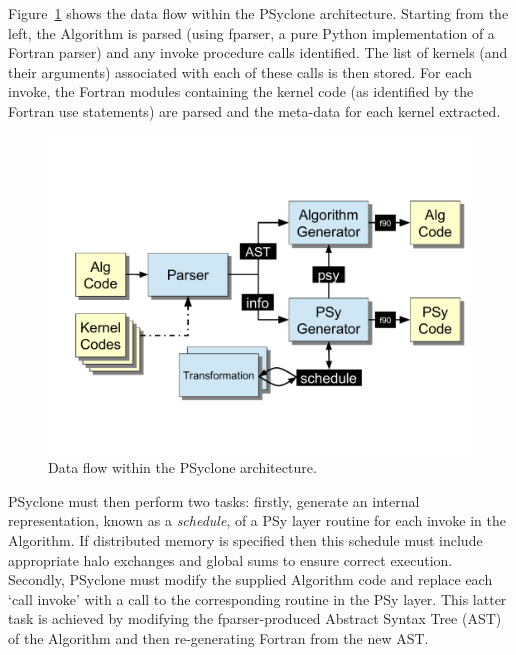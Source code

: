 \documentclass[review,times]{elsarticle}
\begin{document}
Figure~\ref{fig:psyclone-arch} shows the data flow within the PSyclone
architecture.  Starting from the left, the Algorithm is parsed (using
fparser, a pure Python implementation of a Fortran parser) and any
invoke procedure calls identified. The list of kernels (and their arguments)
associated with each of these calls is then stored. For each invoke,
the Fortran modules containing the kernel code (as identified by
the Fortran use statements) are parsed and the meta-data for each kernel
extracted.

\begin{figure}
\centering\includegraphics[width=0.8\linewidth]{psyclone_flow.pdf}
\caption{\label{fig:psyclone-arch}Data flow within the PSyclone architecture.}
\end{figure}

PSyclone must then perform two tasks: firstly, generate an internal
representation, known as a {\em schedule}, of a PSy layer routine for each invoke in
the Algorithm. If distributed memory is specified then this schedule
must include appropriate halo exchanges and global sums to ensure
correct execution. Secondly, PSyclone must modify the supplied Algorithm
code and replace each `call invoke' with a call to the corresponding
routine in the PSy layer. This latter task is achieved by modifying
the fparser-produced Abstract Syntax Tree (AST) of the Algorithm and
then re-generating Fortran from the new AST.
\end{document}
